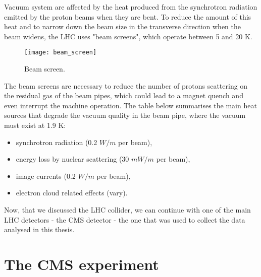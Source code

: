 Vacuum system are affected by the heat produced from the synchrotron radiation emitted by the proton beams when they are bent. To reduce the amount of this heat and to narrow down the beam size in the transverse direction when the beam widens, the LHC uses "beam screens", which operate between 5 and 20 K. 


\begin{figure}[H]
  \centering
  \texttt{[image: beam\_screen]}
  \caption{Beam screen.}\label{beam_screen}
\end{figure}



The beam screens are necessary to reduce the number of protons scattering on the residual gas of the beam pipes, which could lead to a magnet quench and even interrupt the machine operation. The table below summarises the main heat sources that degrade the vacuum quality in the beam pipe, where the vacuum must exist at 1.9 K:


\begin{itemize}
\item synchrotron radiation (0.2 $W/m$ per beam),
\item energy loss by nuclear scattering (30 $mW/m$ per beam),
\item image currents (0.2 $W/m$ per beam),
\item electron cloud related effects (vary).
\end{itemize}



Now, that we discussed the LHC collider, we can continue with one of the main LHC detectors - the CMS detector - the one that was used to collect the data analysed in this thesis. 













\section{The CMS experiment}

